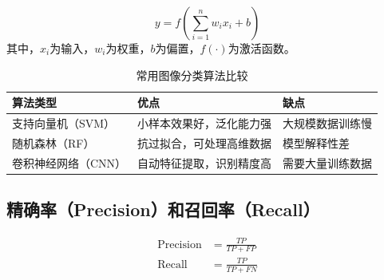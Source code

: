 \begin{equation}
    y = f\left(\sum_{i=1}^{n} w_i x_i + b\right)
\end{equation}
其中，$x_i$为输入，$w_i$为权重，$b$为偏置，$f(\cdot)$为激活函数。

\begin{table}[htbp]
    \centering
    \caption{常用图像分类算法比较}
    \label{tab:classification-algorithms}
    \begin{tabular}{p{} p{} p{}}
        \toprule
        \textbf{算法类型} & \textbf{优点} & \textbf{缺点} \\
        \midrule
        支持向量机（SVM） & 小样本效果好，泛化能力强 & 大规模数据训练慢 \\
        随机森林（RF） & 抗过拟合，可处理高维数据 & 模型解释性差 \\
        卷积神经网络（CNN） & 自动特征提取，识别精度高 & 需要大量训练数据 \\
        \bottomrule
    \end{tabular}
\end{table}

\subsection{精确率（Precision）和召回率（Recall）}
\begin{align}
    \text{Precision} &= \frac{TP}{TP + FP} \label{eq:precision} \\
    \text{Recall} &= \frac{TP}{TP + FN} \label{eq:recall}
\end{align}